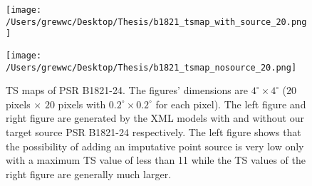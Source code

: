 \documentclass[12pt]{report}
\begin{document}
            \begin{figure}[!ht]
              \begin{center}
              \begin{minipage}{0.46\textwidth}
                \begin{center} 
                  \texttt{[image: /Users/grewwc/Desktop/Thesis/b1821\_tsmap\_with\_source\_20.png]}
                \end{center}
              \end{minipage}
              \begin{minipage}{0.45\textwidth}
                \begin{center}
                  \texttt{[image: /Users/grewwc/Desktop/Thesis/b1821\_tsmap\_nosource\_20.png]}
                \end{center}
              \end{minipage}
            \end{center}
            
            \caption{TS maps of PSR B1821-24. The figures' dimensions are $4^{\circ} \times4^{\circ}$ 
            ($20$ pixels $\times$ $20$ pixels with $0.2^{\circ} \times 0.2^{\circ}$ for each pixel). 
            The \textsf{left} figure and \textsf{right} figure are generated by the XML models with and without our 
            target source PSR B1821-24 respectively. The \textsf{left} figure shows that the possibility 
            of adding an imputative point source is very low only with a maximum TS value of 
            less than 11 while the TS values of the \textsf{right} figure are generally much larger.}
              \label{fig: b1821_tsmap_comparison_20}
            \end{figure}
            \vspace{1cm}
\end{document}
